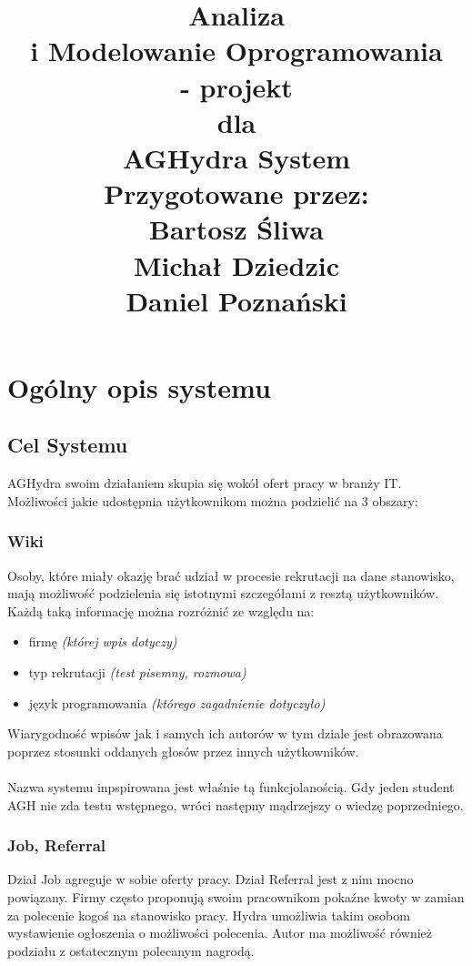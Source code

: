 \documentclass[oneside]{scrreprt}
\title{%
\flushright
\Huge{Analiza\\ i Modelowanie Oprogramowania \\ - projekt}\\
\vspace{2cm}
dla\\
\vspace{2cm}
AGHydra System\\
\vspace{2cm}
Przygotowane przez:\\
Bartosz Śliwa\\
Michał Dziedzic\\
Daniel Poznański\\
}
\date{}
\begin{document}
\maketitle
\tableofcontents
\chapter{Ogólny opis systemu}
\section{Cel Systemu}
AGHydra swoim działaniem skupia się wokół ofert pracy w branży IT.
Możliwości jakie udostępnia użytkownikom można podzielić na 3 obszary:

\subsection{Wiki}
Osoby, które miały okazję brać udział w procesie rekrutacji na dane stanowisko, mają możliwość podzielenia się istotnymi szczegółami z resztą użytkowników.
Każdą taką informację można rozróżnić ze względu na:
\begin{itemize}
	\item firmę \textit{(której wpis dotyczy)}
	\item typ rekrutacji \textit{(test pisemny, rozmowa)}
	\item język programowania \textit{(którego zagadnienie dotyczyło)}
\end{itemize}
Wiarygodność wpisów jak i samych ich autorów w tym dziale jest obrazowana poprzez stosunki oddanych głosów przez innych użytkowników. \\ \\
Nazwa systemu inpspirowana jest właśnie tą funkcjolanością. Gdy jeden student AGH nie zda testu wstępnego, wróci następny mądrzejszy o wiedzę poprzedniego.

\subsection{Job, Referral}
Dział Job agreguje w sobie oferty pracy. 
Dział Referral jest z nim mocno powiązany. 
Firmy często proponują swoim pracownikom pokaźne kwoty w zamian za polecenie kogoś na stanowisko pracy. 
Hydra umożliwia takim osobom wystawienie ogłoszenia o możliwości polecenia. 
Autor ma możliwość również podziału z ostatecznym polecanym nagrodą.
\end{document}
